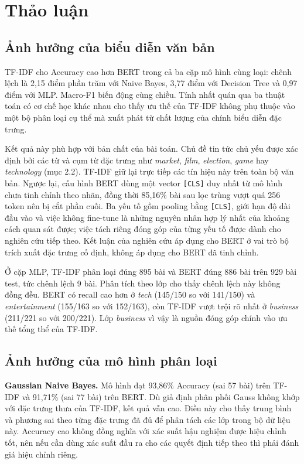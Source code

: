 \documentclass[conference,a4paper]{IEEEtran}
\begin{document}
\section{Thảo luận}

\subsection{Ảnh hưởng của biểu diễn văn bản}

TF-IDF cho Accuracy cao hơn BERT trong cả ba cặp mô hình cùng loại: chênh lệch là 2,15 điểm phần trăm với Naive Bayes, 3,77 điểm với Decision Tree và 0,97 điểm với MLP. Macro-F1 biến động cùng chiều. Tính nhất quán qua ba thuật toán có cơ chế học khác nhau cho thấy ưu thế của TF-IDF không phụ thuộc vào một bộ phân loại cụ thể mà xuất phát từ chất lượng của chính biểu diễn đặc trưng.

Kết quả này phù hợp với bản chất của bài toán. Chủ đề tin tức chủ yếu được xác định bởi các từ và cụm từ đặc trưng như \textit{market}, \textit{film}, \textit{election}, \textit{game} hay \textit{technology} (mục 2.2). TF-IDF giữ lại trực tiếp các tín hiệu này trên toàn bộ văn bản. Ngược lại, cấu hình BERT dùng một vector \texttt{[CLS]} duy nhất từ mô hình chưa tinh chỉnh theo nhãn, đồng thời 85,16\% bài sau lọc trùng vượt quá 256 token nên bị cắt phần cuối. Ba yếu tố gồm pooling bằng \texttt{[CLS]}, giới hạn độ dài đầu vào và việc không fine-tune là những nguyên nhân hợp lý nhất của khoảng cách quan sát được; việc tách riêng đóng góp của từng yếu tố được dành cho nghiên cứu tiếp theo. Kết luận của nghiên cứu áp dụng cho BERT ở vai trò bộ trích xuất đặc trưng cố định, không áp dụng cho BERT đã tinh chỉnh.

Ở cặp MLP, TF-IDF phân loại đúng 895 bài và BERT đúng 886 bài trên 929 bài test, tức chênh lệch 9 bài. Phân tích theo lớp cho thấy chênh lệch này không đồng đều. BERT có recall cao hơn ở \textit{tech} (145/150 so với 141/150) và \textit{entertainment} (155/163 so với 152/163), còn TF-IDF vượt trội rõ nhất ở \textit{business} (211/221 so với 200/221). Lớp \textit{business} vì vậy là nguồn đóng góp chính vào ưu thế tổng thể của TF-IDF.

\subsection{Ảnh hưởng của mô hình phân loại}

\textbf{Gaussian Naive Bayes.} Mô hình đạt 93,86\% Accuracy (sai 57 bài) trên TF-IDF và 91,71\% (sai 77 bài) trên BERT. Dù giả định phân phối Gauss không khớp với đặc trưng thưa của TF-IDF, kết quả vẫn cao. Điều này cho thấy trung bình và phương sai theo từng đặc trưng đã đủ để phân tách các lớp trong bộ dữ liệu này. Accuracy cao không đồng nghĩa với xác suất hậu nghiệm được hiệu chỉnh tốt, nên nếu cần dùng xác suất đầu ra cho các quyết định tiếp theo thì phải đánh giá hiệu chỉnh riêng.
\end{document}

